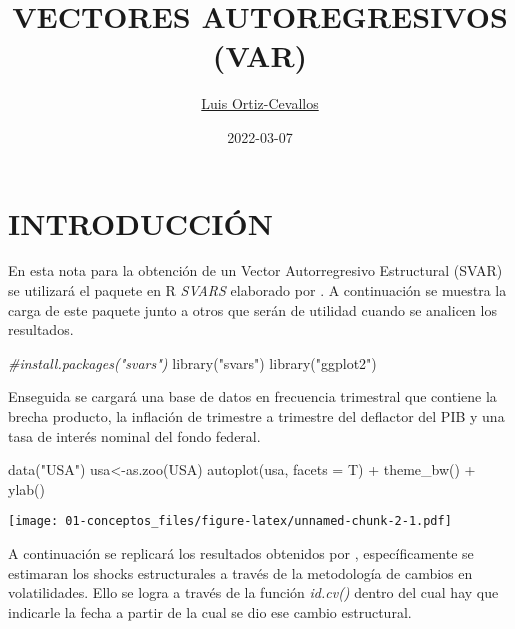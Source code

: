 \documentclass[
]{book}
\title{VECTORES AUTOREGRESIVOS (VAR)}
\author{\href{https://ortiz-cevallos.github.io/MYSELF/}{Luis Ortiz-Cevallos}}
\date{2022-03-07}
\newenvironment{Shaded}{\begin{snugshade}}{\end{snugshade}}
\newcommand{\AttributeTok}[1]{\textcolor[rgb]{0.77,0.63,0.00}{#1}}
\newcommand{\CommentTok}[1]{\textcolor[rgb]{0.56,0.35,0.01}{\textit{#1}}}
\newcommand{\FunctionTok}[1]{\textcolor[rgb]{0.00,0.00,0.00}{#1}}
\newcommand{\NormalTok}[1]{#1}
\newcommand{\OtherTok}[1]{\textcolor[rgb]{0.56,0.35,0.01}{#1}}
\newcommand{\SpecialCharTok}[1]{\textcolor[rgb]{0.00,0.00,0.00}{#1}}
\newcommand{\StringTok}[1]{\textcolor[rgb]{0.31,0.60,0.02}{#1}}
\begin{document}
\maketitle

{
\setcounter{tocdepth}{1}
\tableofcontents
}
\hypertarget{introducciuxf3n}{%
\chapter{INTRODUCCIÓN}\label{introducciuxf3n}}

En esta nota para la obtención de un Vector Autorregresivo Estructural (SVAR) se utilizará el paquete en R \emph{SVARS} elaborado por \citet{SVAR21}. A continuación se muestra la carga de este paquete junto a otros que serán de utilidad cuando se analicen los resultados.

\begin{Shaded}
\begin{Highlighting}[]
\CommentTok{\#install.packages("svars")}
\FunctionTok{library}\NormalTok{(}\StringTok{"svars"}\NormalTok{)}
\FunctionTok{library}\NormalTok{(}\StringTok{"ggplot2"}\NormalTok{)}
\end{Highlighting}
\end{Shaded}

Enseguida se cargará una base de datos en frecuencia trimestral que contiene la brecha producto, la inflación de trimestre a trimestre del deflactor del PIB y una tasa de interés nominal del fondo federal.

\begin{Shaded}
\begin{Highlighting}[]
\FunctionTok{data}\NormalTok{(}\StringTok{"USA"}\NormalTok{)}
\NormalTok{usa}\OtherTok{\textless{}{-}}\FunctionTok{as.zoo}\NormalTok{(USA)}
\FunctionTok{autoplot}\NormalTok{(usa, }\AttributeTok{facets =}\NormalTok{ T) }\SpecialCharTok{+} \FunctionTok{theme\_bw}\NormalTok{() }\SpecialCharTok{+} \FunctionTok{ylab}\NormalTok{(}\StringTok{\textquotesingle{}\textquotesingle{}}\NormalTok{)}
\end{Highlighting}
\end{Shaded}

\texttt{[image: 01-conceptos\_files/figure-latex/unnamed-chunk-2-1.pdf]}

A continuación se replicará los resultados obtenidos por \citet{Herwartz2016}, específicamente se estimaran los shocks estructurales a través de la metodología de cambios en volatilidades. Ello se logra a través de la función \emph{id.cv()} dentro del cual hay que indicarle la fecha a partir de la cual se dio ese cambio estructural.
\end{document}
